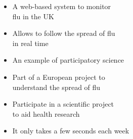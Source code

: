\documentclass[a5paper,12pt]{article}
\begin{document}
\pagestyle{empty}
{\large \begin{itemize}
\item A web-based system to monitor\\flu in the UK
\item Allows to follow the spread of flu\\in real time
\item An example of participatory science
\item Part of a European project to\\understand the spread of flu
\end{itemize}}
\vspace{1cm}
\begin{itemize}
\item Participate in a scientific project\\ to aid health research
\item It only takes a few seconds each week
\end{itemize}
\end{document}
